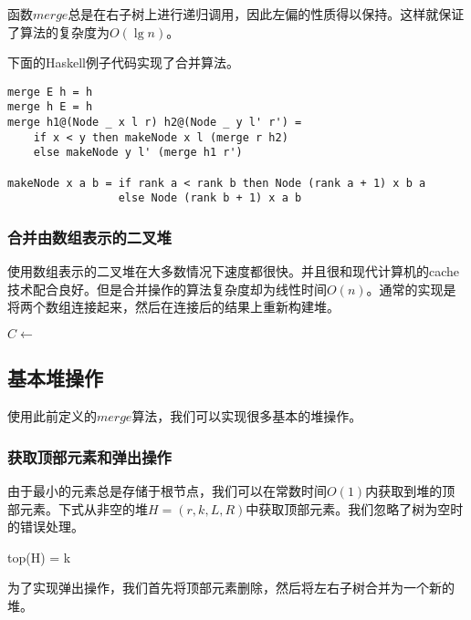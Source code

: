 \documentclass[UTF8]{article}
\begin{document}
函数$merge$总是在右子树上进行递归调用，因此左偏的性质得以保持。这样就保证了算法的复杂度为$O(\lg n)$。

下面的Haskell例子代码实现了合并算法。

\lstset{language=Haskell}
\begin{lstlisting}
merge E h = h
merge h E = h
merge h1@(Node _ x l r) h2@(Node _ y l' r') =
    if x < y then makeNode x l (merge r h2)
    else makeNode y l' (merge h1 r')

makeNode x a b = if rank a < rank b then Node (rank a + 1) x b a
                 else Node (rank b + 1) x a b
\end{lstlisting}

\subsubsection{合并由数组表示的二叉堆}

使用数组表示的二叉堆在大多数情况下速度都很快。并且很和现代计算机的cache技术配合良好。但是合并操作的算法复杂度却为线性时间$O(n)$。通常的实现是将两个数组连接起来，然后在连接后的结果上重新构建堆\cite{NIST}。

\begin{algorithmic}[1]
  \State $C \gets$ 
  \State {}
\EndFunction
\end{algorithmic}

\subsection{基本堆操作}

使用此前定义的$merge$算法，我们可以实现很多基本的堆操作。

\subsubsection{获取顶部元素和弹出操作}

由于最小的元素总是存储于根节点，我们可以在常数时间$O(1)$内获取到堆的顶部元素。下式从非空的堆$H = (r, k, L, R)$中获取顶部元素。我们忽略了树为空时的错误处理。

\be
top(H) = k
\ee

为了实现弹出操作，我们首先将顶部元素删除，然后将左右子树合并为一个新的堆。
\end{document}
